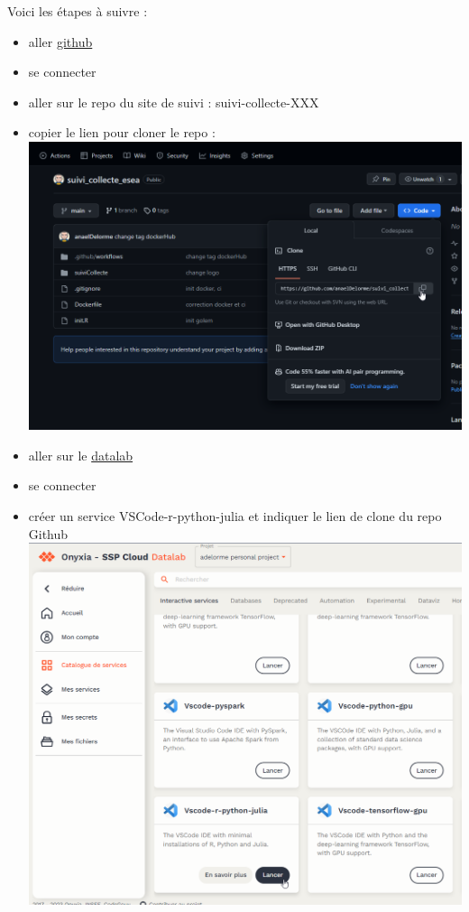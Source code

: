 \documentclass[
  letterpaper,
  DIV=11,
  numbers=noendperiod]{scrreprt}
\providecommand{\tightlist}{%
  \setlength{\itemsep}{0pt}\setlength{\parskip}{0pt}}\usepackage{longtable,booktabs,array}
\begin{document}
Voici les étapes à suivre :

\begin{itemize}
\tightlist
\item
  aller \href{https://github.com/}{github}\\
\item
  se connecter\\
\item
  aller sur le repo du site de suivi : suivi-collecte-XXX\\
\item
  copier le lien pour cloner le repo :\\
  \includegraphics{./images/github_clone.png}\\
\item
  aller sur le \href{https://datalab.sspcloud.fr/}{datalab}\\
\item
  se connecter\\
\item
  créer un service VSCode-r-python-julia et indiquer le lien de clone du
  repo Github\\
  \includegraphics{./images/datalab_vscode_service.png}\\

\end{itemize}
\end{document}
